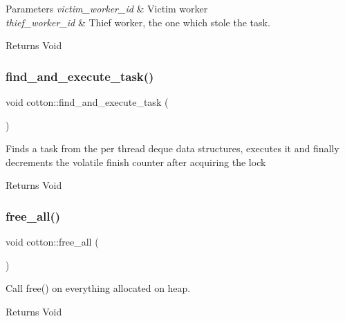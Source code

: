 \begin{DoxyParams}{Parameters}
{\em victim\+\_\+worker\+\_\+id} & Victim worker \\
\hline
{\em thief\+\_\+worker\+\_\+id} & Thief worker, the one which stole the task.\\
\hline
\end{DoxyParams}
\begin{DoxyReturn}{Returns}
Void 
\end{DoxyReturn}
\mbox{\label{cotton-runtime_8h_file_af22caee9434a7e06a09b2f9a0417c1eb}} 
\subsubsection{\texorpdfstring{find\+\_\+and\+\_\+execute\+\_\+task()}{find\_and\_execute\_task()}}
{\footnotesize\ttfamily void cotton\+::find\+\_\+and\+\_\+execute\+\_\+task (\begin{DoxyParamCaption}{ }\end{DoxyParamCaption})}

Finds a task from the per thread deque data structures, executes it and finally decrements the volatile finish counter after acquiring the lock

\begin{DoxyReturn}{Returns}
Void 
\end{DoxyReturn}
\mbox{\label{cotton-runtime_8h_file_ad169fe95f5f03bdfa569dd365dde6c12}} 
\subsubsection{\texorpdfstring{free\+\_\+all()}{free\_all()}}
{\footnotesize\ttfamily void cotton\+::free\+\_\+all (\begin{DoxyParamCaption}{ }\end{DoxyParamCaption})}

Call free() on everything allocated on heap.

\begin{DoxyReturn}{Returns}
Void 
\end{DoxyReturn}
\mbox{\label{cotton-runtime_8h_file_a1cae25b77bd884fcdcf2532663056d22}} 
